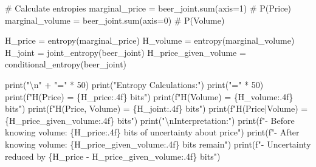 \documentclass[
  11pt,
  letterpaper,
  oneside,
  openany]{book}
\newenvironment{Shaded}{\begin{snugshade}}{\end{snugshade}}
\newcommand{\BuiltInTok}[1]{\textcolor[rgb]{0.00,0.23,0.31}{#1}}
\newcommand{\CharTok}[1]{\textcolor[rgb]{0.13,0.47,0.30}{#1}}
\newcommand{\CommentTok}[1]{\textcolor[rgb]{0.37,0.37,0.37}{#1}}
\newcommand{\DecValTok}[1]{\textcolor[rgb]{0.68,0.00,0.00}{#1}}
\newcommand{\NormalTok}[1]{\textcolor[rgb]{0.00,0.23,0.31}{#1}}
\newcommand{\OperatorTok}[1]{\textcolor[rgb]{0.37,0.37,0.37}{#1}}
\newcommand{\SpecialCharTok}[1]{\textcolor[rgb]{0.37,0.37,0.37}{#1}}
\newcommand{\SpecialStringTok}[1]{\textcolor[rgb]{0.13,0.47,0.30}{#1}}
\newcommand{\StringTok}[1]{\textcolor[rgb]{0.13,0.47,0.30}{#1}}
\begin{document}
\begin{Shaded}
\begin{Highlighting}[]
\CommentTok{\# Calculate entropies}
\NormalTok{marginal\_price }\OperatorTok{=}\NormalTok{ beer\_joint.}\BuiltInTok{sum}\NormalTok{(axis}\OperatorTok{=}\DecValTok{1}\NormalTok{)  }\CommentTok{\# P(Price)}
\NormalTok{marginal\_volume }\OperatorTok{=}\NormalTok{ beer\_joint.}\BuiltInTok{sum}\NormalTok{(axis}\OperatorTok{=}\DecValTok{0}\NormalTok{)  }\CommentTok{\# P(Volume)}

\NormalTok{H\_price }\OperatorTok{=}\NormalTok{ entropy(marginal\_price)}
\NormalTok{H\_volume }\OperatorTok{=}\NormalTok{ entropy(marginal\_volume)}
\NormalTok{H\_joint }\OperatorTok{=}\NormalTok{ joint\_entropy(beer\_joint)}
\NormalTok{H\_price\_given\_volume }\OperatorTok{=}\NormalTok{ conditional\_entropy(beer\_joint)}

\BuiltInTok{print}\NormalTok{(}\StringTok{"}\CharTok{\textbackslash{}n}\StringTok{"} \OperatorTok{+} \StringTok{"="} \OperatorTok{*} \DecValTok{50}\NormalTok{)}
\BuiltInTok{print}\NormalTok{(}\StringTok{"Entropy Calculations:"}\NormalTok{)}
\BuiltInTok{print}\NormalTok{(}\StringTok{"="} \OperatorTok{*} \DecValTok{50}\NormalTok{)}
\BuiltInTok{print}\NormalTok{(}\SpecialStringTok{f"H(Price) = }\SpecialCharTok{\{}\NormalTok{H\_price}\SpecialCharTok{:.4f\}}\SpecialStringTok{ bits"}\NormalTok{)}
\BuiltInTok{print}\NormalTok{(}\SpecialStringTok{f"H(Volume) = }\SpecialCharTok{\{}\NormalTok{H\_volume}\SpecialCharTok{:.4f\}}\SpecialStringTok{ bits"}\NormalTok{)}
\BuiltInTok{print}\NormalTok{(}\SpecialStringTok{f"H(Price, Volume) = }\SpecialCharTok{\{}\NormalTok{H\_joint}\SpecialCharTok{:.4f\}}\SpecialStringTok{ bits"}\NormalTok{)}
\BuiltInTok{print}\NormalTok{(}\SpecialStringTok{f"H(Price|Volume) = }\SpecialCharTok{\{}\NormalTok{H\_price\_given\_volume}\SpecialCharTok{:.4f\}}\SpecialStringTok{ bits"}\NormalTok{)}
\BuiltInTok{print}\NormalTok{(}\StringTok{"}\CharTok{\textbackslash{}n}\StringTok{Interpretation:"}\NormalTok{)}
\BuiltInTok{print}\NormalTok{(}\SpecialStringTok{f"{-} Before knowing volume: }\SpecialCharTok{\{}\NormalTok{H\_price}\SpecialCharTok{:.4f\}}\SpecialStringTok{ bits of uncertainty about price"}\NormalTok{)}
\BuiltInTok{print}\NormalTok{(}\SpecialStringTok{f"{-} After knowing volume: }\SpecialCharTok{\{}\NormalTok{H\_price\_given\_volume}\SpecialCharTok{:.4f\}}\SpecialStringTok{ bits remain"}\NormalTok{)}
\BuiltInTok{print}\NormalTok{(}\SpecialStringTok{f"{-} Uncertainty reduced by }\SpecialCharTok{\{}\NormalTok{H\_price }\OperatorTok{{-}}\NormalTok{ H\_price\_given\_volume}\SpecialCharTok{:.4f\}}\SpecialStringTok{ bits"}\NormalTok{)}
\end{Highlighting}
\end{Shaded}
\end{document}

